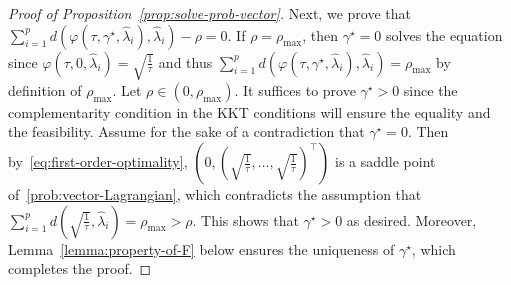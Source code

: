 \documentclass[11pt]{article}
\newcommand{\opt}{^\star}
\def\transpose{\top}
\newcommand{\wh}{\widehat}
\begin{document}
\begin{proof}[Proof of Proposition~\ref{prop:solve-prob-vector}]
    Next, we prove that $\sum_{i=1}^p d(\varphi(\tau, \gamma\opt, \widehat{\lambda}_i), \widehat{\lambda}_i)- \rho=0$. If $\rho = \rho_{\max}$, then $\gamma\opt=0$ solves the equation since $\varphi(\tau,0,\wh\lambda_i)=\sqrt{\frac{1}{\tau}}$ and thus $\sum_{i=1}^p d(\varphi(\tau, \gamma\opt, \widehat{\lambda}_i), \widehat{\lambda}_i) = \rho_{\max}$ by definition of $\rho_{\max}$. Let $\rho\in(0,\rho_{\max})$.    It suffices to prove $\gamma\opt>0$ since the complementarity condition in the KKT conditions will ensure the equality and the feasibility. Assume for the sake of a contradiction that $\gamma\opt=0$. Then by~\eqref{eq:first-order-optimality}, $\left(0, \left(\sqrt{\frac{1}{\tau}}, \ldots ,\sqrt{\frac{1}{\tau}}\right)^\transpose\right)$ is a saddle point of~\eqref{prob:vector-Lagrangian}, which contradicts the assumption that $\sum_{i=1}^p d\left(\sqrt{\frac{1}{\tau}},\widehat{\lambda}_i\right) = \rho_{\max} >  \rho$. 
    This shows that $\gamma\opt>0$ as desired. Moreover, Lemma~\ref{lemma:property-of-F} below ensures the uniqueness of $\gamma\opt$, which completes the proof.
\end{proof}
\end{document}
